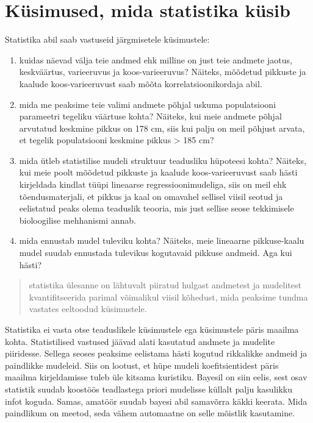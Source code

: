 \documentclass[]{book}
\begin{document}
\section{Küsimused, mida statistika
küsib}\label{kusimused-mida-statistika-kusib}

Statistika abil saab vastuseid järgmisetele küsimustele:

\begin{enumerate}
\def\labelenumi{\arabic{enumi})}
\item
  kuidas näevad välja teie andmed ehk milline on just teie andmete
  jaotus, keskväärtus, varieeruvus ja koos-varieeruvus? Näiteks,
  mõõdetud pikkuste ja kaalude koos-varieeruvust saab mõõta
  korrelatsioonikordaja abil.
\item
  mida me peaksime teie valimi andmete põhjal uskuma populatsiooni
  parameetri tegeliku väärtuse kohta? Näiteks, kui meie andmete põhjal
  arvutatud keskmine pikkus on 178 cm, siis kui palju on meil põhjust
  arvata, et tegelik populatsiooni keskmine pikkus \textgreater{} 185
  cm?
\item
  mida ütleb statistilise mudeli struktuur teadusliku hüpoteesi kohta?
  Näiteks, kui meie poolt mõõdetud pikkuste ja kaalude koos-varieeruvust
  saab hästi kirjeldada kindlat tüüpi lineaarse regressioonimudeliga,
  siis on meil ehk tõendusmaterjali, et pikkus ja kaal on omavahel
  sellisel viisil seotud ja eelistatud peaks olema teaduslik teooria,
  mis just sellise seose tekkimisele bioloogilise mehhanismi annab.
\item
  mida ennustab mudel tuleviku kohta? Näiteks, meie lineaarne
  pikkuse-kaalu mudel suudab ennustada tulevikus kogutavaid pikkuse
  andmeid. Aga kui hästi?
\end{enumerate}

\begin{quote}
statistika ülesanne on lähtuvalt piiratud hulgast andmetest ja
mudelitest kvantifitseerida parimal võimalikul viisil kõhedust, mida
peaksime tundma vastates eeltoodud küsimustele.
\end{quote}

Statistika ei vasta otse teaduslikele küsimustele ega küsimustele päris
maailma kohta. Statistilised vastused jäävad alati kasutatud andmete ja
mudelite piiridesse. Sellega seoses peaksime eelistama hästi kogutud
rikkalikke andmeid ja paindlikke mudeleid. Siis on lootust, et hüpe
mudeli koefitsientidest päris maailma kirjeldamisse tuleb üle kitsama
kuristiku. Bayesil on siin eelis, sest osav statistik suudab koostöös
teadlastega priori mudelisse küllalt palju kasulikku infot koguda.
Samas, amatöör suudab bayesi abil samavõrra käkki keerata. Mida
paindlikum on meetod, seda vähem automaatne on selle mõistlik
kasutamine.
\end{document}
